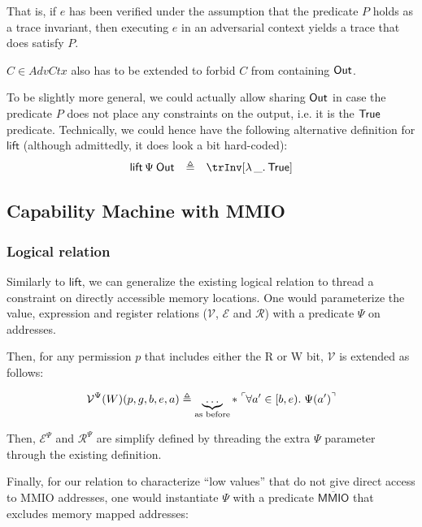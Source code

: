 \documentclass{article}
\newcommand{\Sf}[1]{\ensuremath{\mathsf{#1}}}
\newcommand{\pure}[1]{\tensor[^{\ulcorner}]{#1{}}{^{\urcorner}}} %
\newcommand{\MMIO}{\Sf{MMIO}\xspace}
\begin{document}
That is, if $e$ has been verified under the assumption that the predicate $P$
holds as a trace invariant, then executing $e$ in an adversarial context yields
a trace that does satisfy $P$.

$C \in \textit{AdvCtx}$ also has to be extended to forbid $C$ from containing
$\OutV$.

\medskip

To be slightly more general, we could actually allow sharing $\OutV$ in case the
predicate $P$ does not place any constraints on the output, i.e. it is the
$\textsf{True}$ predicate. Technically, we could hence have the following alternative
definition for $\Sf{lift}$ (although admittedly, it does look a bit
hard-coded):
%
\[
  \begin{array}{lcl}
    \liftP \OutV & \eqdef & \trInv[\Lam{\_}.\TRUE]
  \end{array}
\]

\subsection{Capability Machine with MMIO}

\subsubsection{Logical relation}

\newcommand{\VR}{\mathcal{V}}
\newcommand{\ER}{\mathcal{E}}
\newcommand{\RR}{\mathcal{R}}
\newcommand{\notMMIO}{\overline{\MMIO}}

Similarly to $\Sf{lift}$, we can generalize the existing logical relation
to thread a constraint on directly accessible memory locations. One would
parameterize the value, expression and register relations ($\VR$, $\ER$ and $\RR$)
with a predicate $\Psi$ on addresses.

Then, for any permission $p$ that includes either the R or W bit, $\VR$
is extended as follows:

\[
  \VR^{\Psi}(W)(p, g, b, e, a) \eqdef \underbrace{\ldots}_{\text{as before}} \ast \; \pure{\forall a' \in [b,e).\; \Psi(a')}
\]

Then, $\ER^{\Psi}$ and $\RR^{\Psi}$ are simplify defined by threading the extra
$\Psi$ parameter through the existing definition.

Finally, for our relation to characterize ``low values'' that do not give direct
access to MMIO addresses, one would instantiate $\Psi$ with a predicate
$\notMMIO$ that excludes memory mapped addresses:
\end{document}
